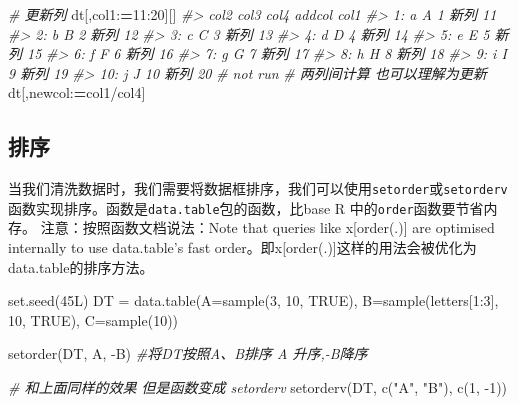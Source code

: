 \documentclass[
]{book}
\newenvironment{Shaded}{\begin{snugshade}}{\end{snugshade}}
\newcommand{\AttributeTok}[1]{\textcolor[rgb]{0.77,0.63,0.00}{#1}}
\newcommand{\CommentTok}[1]{\textcolor[rgb]{0.56,0.35,0.01}{\textit{#1}}}
\newcommand{\ConstantTok}[1]{\textcolor[rgb]{0.00,0.00,0.00}{#1}}
\newcommand{\DecValTok}[1]{\textcolor[rgb]{0.00,0.00,0.81}{#1}}
\newcommand{\ErrorTok}[1]{\textcolor[rgb]{0.64,0.00,0.00}{\textbf{#1}}}
\newcommand{\FunctionTok}[1]{\textcolor[rgb]{0.00,0.00,0.00}{#1}}
\newcommand{\NormalTok}[1]{#1}
\newcommand{\OtherTok}[1]{\textcolor[rgb]{0.56,0.35,0.01}{#1}}
\newcommand{\SpecialCharTok}[1]{\textcolor[rgb]{0.00,0.00,0.00}{#1}}
\newcommand{\StringTok}[1]{\textcolor[rgb]{0.31,0.60,0.02}{#1}}
\begin{document}
\begin{Shaded}
\begin{Highlighting}[]
\CommentTok{\# 更新列}
\NormalTok{dt[,col1}\SpecialCharTok{:}\ErrorTok{=}\DecValTok{11}\SpecialCharTok{:}\DecValTok{20}\NormalTok{][]}
\CommentTok{\#\textgreater{}     col2 col3 col4 addcol col1}
\CommentTok{\#\textgreater{}  1:    a    A    1   新列   11}
\CommentTok{\#\textgreater{}  2:    b    B    2   新列   12}
\CommentTok{\#\textgreater{}  3:    c    C    3   新列   13}
\CommentTok{\#\textgreater{}  4:    d    D    4   新列   14}
\CommentTok{\#\textgreater{}  5:    e    E    5   新列   15}
\CommentTok{\#\textgreater{}  6:    f    F    6   新列   16}
\CommentTok{\#\textgreater{}  7:    g    G    7   新列   17}
\CommentTok{\#\textgreater{}  8:    h    H    8   新列   18}
\CommentTok{\#\textgreater{}  9:    i    I    9   新列   19}
\CommentTok{\#\textgreater{} 10:    j    J   10   新列   20}
\CommentTok{\# not run }
\CommentTok{\# 两列间计算 也可以理解为更新}
\NormalTok{dt[,newcol}\SpecialCharTok{:}\ErrorTok{=}\NormalTok{col1}\SpecialCharTok{/}\NormalTok{col4]}
\end{Highlighting}
\end{Shaded}

\hypertarget{ux6392ux5e8f}{%
\subsection{排序}\label{ux6392ux5e8f}}

当我们清洗数据时，我们需要将数据框排序，我们可以使用\texttt{setorder}或\texttt{setorderv}函数实现排序。函数是\texttt{data.table}包的函数，比base R 中的\texttt{order}函数要节省内存。
注意：按照函数文档说法：Note that queries like x{[}order(.){]} are optimised internally to use data.table's fast order。即x{[}order(.){]}这样的用法会被优化为data.table的排序方法。

\begin{Shaded}
\begin{Highlighting}[]
\FunctionTok{set.seed}\NormalTok{(45L)}
\NormalTok{DT }\OtherTok{=} \FunctionTok{data.table}\NormalTok{(}\AttributeTok{A=}\FunctionTok{sample}\NormalTok{(}\DecValTok{3}\NormalTok{, }\DecValTok{10}\NormalTok{, }\ConstantTok{TRUE}\NormalTok{),}
         \AttributeTok{B=}\FunctionTok{sample}\NormalTok{(letters[}\DecValTok{1}\SpecialCharTok{:}\DecValTok{3}\NormalTok{], }\DecValTok{10}\NormalTok{, }\ConstantTok{TRUE}\NormalTok{), }\AttributeTok{C=}\FunctionTok{sample}\NormalTok{(}\DecValTok{10}\NormalTok{))}

\FunctionTok{setorder}\NormalTok{(DT, A, }\SpecialCharTok{{-}}\NormalTok{B) }\CommentTok{\#将DT按照A、B排序 A 升序,{-}B降序}

\CommentTok{\# 和上面同样的效果 但是函数变成 setorderv}
\FunctionTok{setorderv}\NormalTok{(DT, }\FunctionTok{c}\NormalTok{(}\StringTok{"A"}\NormalTok{, }\StringTok{"B"}\NormalTok{), }\FunctionTok{c}\NormalTok{(}\DecValTok{1}\NormalTok{, }\SpecialCharTok{{-}}\DecValTok{1}\NormalTok{))}
\end{Highlighting}
\end{Shaded}
\end{document}
